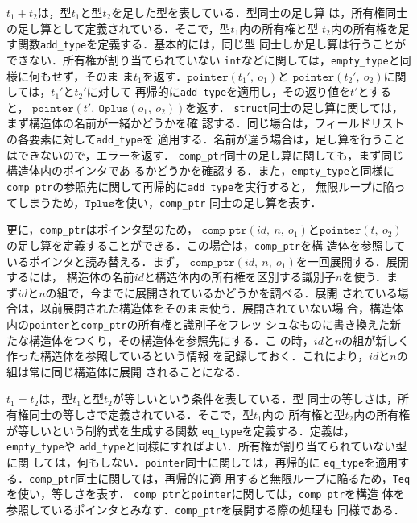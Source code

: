 $t_{1} + t_{2}$は，型$t_1$と型$t_2$を足した型を表している．型同士の足し算
は，所有権同士の足し算として定義されている．そこで，型$t_1$内の所有権と型
$t_2$内の所有権を足す関数\texttt{add\_type}を定義する．基本的には，同じ型
同士しか足し算は行うことができない．所有権が割り当てられていない
\texttt{int}などに関しては，\texttt{empty\_type}と同様に何もせず，そのま
ま$t_{1}$を返す．$\texttt{pointer}(t_{1}',\ o_{1})$と
$\texttt{pointer}(t_{2}',\ o_{2})$に関しては，$t_{1}'$と$t_{2}'$に対して
再帰的に\texttt{add\_type}を適用し，その返り値を$t'$とすると，
$\texttt{pointer}(t',\ \texttt{Oplus}(o_{1},\ o_{2}))$を返す．
\texttt{struct}同士の足し算に関しては，まず構造体の名前が一緒かどうかを確
認する．同じ場合は，フィールドリストの各要素に対して\texttt{add\_type}を
適用する．名前が違う場合は，足し算を行うことはできないので，エラーを返す．
\texttt{comp\_ptr}同士の足し算に関しても，まず同じ構造体内のポインタであ
るかどうかを確認する．また，\texttt{empty\_type}と同様に
\texttt{comp\_ptr}の参照先に関して再帰的に\texttt{add\_type}を実行すると，
無限ループに陥ってしまうため，$\texttt{Tplus}$を使い，\texttt{comp\_ptr}
同士の足し算を表す．

更に，\texttt{comp\_ptr}はポインタ型のため，
$\texttt{comp\_ptr}(\mathit{id},\ n,\ o_{1})$と$\texttt{pointer}(t,\
o_{2})$の足し算を定義することができる．この場合は，\texttt{comp\_ptr}を構
造体を参照しているポインタと読み替える．まず，
$\texttt{comp\_ptr}(\mathit{id},\ n,\ o_{1})$を一回展開する．展開するには，
構造体の名前$\mathit{id}$と構造体内の所有権を区別する識別子$n$を使う．ま
ず$\mathit{id}$と$n$の組で，今までに展開されているかどうかを調べる．展開
されている場合は，以前展開された構造体をそのまま使う．展開されていない場
合，構造体内の\texttt{pointer}と\texttt{comp\_ptr}の所有権と識別子をフレッ
シュなものに書き換えた新たな構造体をつくり，その構造体を参照先にする．こ
の時，$\mathit{id}$と$n$の組が新しく作った構造体を参照しているという情報
を記録しておく．これにより，$\mathit{id}$と$n$の組は常に同じ構造体に展開
されることになる．

$t_{1} = t_{2}$は，型$t_{1}$と型$t_{2}$が等しいという条件を表している．型
同士の等しさは，所有権同士の等しさで定義されている．そこで，型$t_{1}$内の
所有権と型$t_{2}$内の所有権が等しいという制約式を生成する関数
\texttt{eq\_type}を定義する．定義は，\texttt{empty\_type}や
\texttt{add\_type}と同様にすればよい．所有権が割り当てられていない型に関
しては，何もしない．\texttt{pointer}同士に関しては，再帰的に
\texttt{eq\_type}を適用する．\texttt{comp\_ptr}同士に関しては，再帰的に適
用すると無限ループに陥るため，\texttt{Teq}を使い，等しさを表す．
\texttt{comp\_ptr}と\texttt{pointer}に関しては，\texttt{comp\_ptr}を構造
体を参照しているポインタとみなす．\texttt{comp\_ptr}を展開する際の処理も
同様である．


